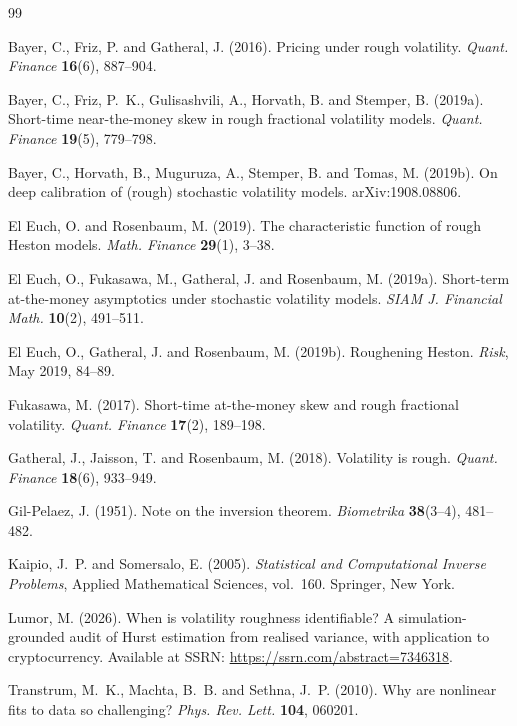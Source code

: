 \documentclass[11pt,a4paper]{article}
\numberwithin{equation}{section}
\begin{document}
\begin{thebibliography}{99}

 Bayer, C., Friz, P. and Gatheral, J. (2016).
Pricing under rough volatility.
\emph{Quant. Finance} \textbf{16}(6), 887--904.

 Bayer, C., Friz, P.~K., Gulisashvili, A., Horvath, B.
and Stemper, B. (2019a).
Short-time near-the-money skew in rough fractional volatility models.
\emph{Quant. Finance} \textbf{19}(5), 779--798.

 Bayer, C., Horvath, B., Muguruza, A., Stemper, B.
and Tomas, M. (2019b).
On deep calibration of (rough) stochastic volatility models. arXiv:1908.08806.

 El Euch, O. and Rosenbaum, M. (2019).
The characteristic function of rough Heston models.
\emph{Math. Finance} \textbf{29}(1), 3--38.

 El Euch, O., Fukasawa, M., Gatheral, J.
and Rosenbaum, M. (2019a).
Short-term at-the-money asymptotics under stochastic volatility models.
\emph{SIAM J. Financial Math.} \textbf{10}(2), 491--511.

 El Euch, O., Gatheral, J. and Rosenbaum, M. (2019b).
Roughening Heston. \emph{Risk}, May 2019, 84--89.

 Fukasawa, M. (2017).
Short-time at-the-money skew and rough fractional volatility.
\emph{Quant. Finance} \textbf{17}(2), 189--198.

 Gatheral, J., Jaisson, T. and Rosenbaum, M. (2018).
Volatility is rough. \emph{Quant. Finance} \textbf{18}(6), 933--949.

 Gil-Pelaez, J. (1951).
Note on the inversion theorem. \emph{Biometrika} \textbf{38}(3--4), 481--482.

 Kaipio, J.~P. and
Somersalo, E. (2005). \emph{Statistical and Computational Inverse Problems},
Applied Mathematical Sciences, vol.~160. Springer, New York.

 Lumor, M. (2026).
When is volatility roughness identifiable? A simulation-grounded audit of Hurst
estimation from realised variance, with application to cryptocurrency. Available at
SSRN: \url{https://ssrn.com/abstract=7346318}.

 Transtrum, M.~K., Machta, B.~B.
and Sethna, J.~P. (2010). Why are nonlinear fits to data so challenging?
\emph{Phys. Rev. Lett.} \textbf{104}, 060201.

\end{thebibliography}
\end{document}
